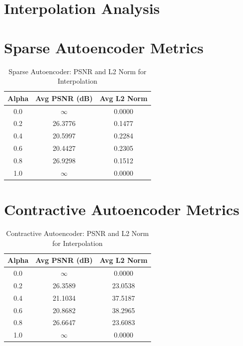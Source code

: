 \documentclass[12pt]{article}
\begin{document}
\section*{Interpolation Analysis}

\section*{Sparse Autoencoder Metrics}

\begin{table}[h!]
\centering
\begin{tabular}{ccc}
\toprule
\textbf{Alpha} & \textbf{Avg PSNR (dB)} & \textbf{Avg L2 Norm} \\
\midrule
0.0 & $\infty$ & 0.0000 \\
0.2 & 26.3776 & 0.1477 \\
0.4 & 20.5997 & 0.2284 \\
0.6 & 20.4427 & 0.2305 \\
0.8 & 26.9298 & 0.1512 \\
1.0 & $\infty$ & 0.0000 \\
\bottomrule
\end{tabular}
\caption{Sparse Autoencoder: PSNR and L2 Norm for Interpolation}
\end{table}

\vspace{1cm}



\section*{Contractive Autoencoder Metrics}

\begin{table}[h!]
\centering
\begin{tabular}{ccc}
\toprule
\textbf{Alpha} & \textbf{Avg PSNR (dB)} & \textbf{Avg L2 Norm} \\
\midrule
0.0 & $\infty$ & 0.0000 \\
0.2 & 26.3589 & 23.0538 \\
0.4 & 21.1034 & 37.5187 \\
0.6 & 20.8682 & 38.2965 \\
0.8 & 26.6647 & 23.6083 \\
1.0 & $\infty$ & 0.0000 \\
\bottomrule
\end{tabular}
\caption{Contractive Autoencoder: PSNR and L2 Norm for Interpolation}
\end{table}
\end{document}
